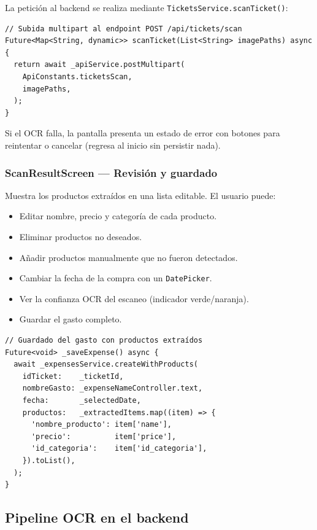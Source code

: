 \documentclass[12pt, letterpaper]{article}
\newcommand{\campo}[1]{\texttt{#1}}
\begin{document}
La petición al backend se realiza mediante \campo{TicketsService.scanTicket()}:

\begin{lstlisting}
// Subida multipart al endpoint POST /api/tickets/scan
Future<Map<String, dynamic>> scanTicket(List<String> imagePaths) async {
  return await _apiService.postMultipart(
    ApiConstants.ticketsScan,
    imagePaths,
  );
}
\end{lstlisting}

Si el OCR falla, la pantalla presenta un estado de error con botones para
reintentar o cancelar (regresa al inicio sin persistir nada).

\subsubsection{ScanResultScreen — Revisión y guardado}

Muestra los productos extraídos en una lista editable. El usuario puede:

\begin{itemize}
  \item Editar nombre, precio y categoría de cada producto.
  \item Eliminar productos no deseados.
  \item Añadir productos manualmente que no fueron detectados.
  \item Cambiar la fecha de la compra con un \campo{DatePicker}.
  \item Ver la confianza OCR del escaneo (indicador verde/naranja).
  \item Guardar el gasto completo.
\end{itemize}

\begin{lstlisting}
// Guardado del gasto con productos extraídos
Future<void> _saveExpense() async {
  await _expensesService.createWithProducts(
    idTicket:    _ticketId,
    nombreGasto: _expenseNameController.text,
    fecha:       _selectedDate,
    productos:   _extractedItems.map((item) => {
      'nombre_producto': item['name'],
      'precio':          item['price'],
      'id_categoria':    item['id_categoria'],
    }).toList(),
  );
}
\end{lstlisting}

\subsection{Pipeline OCR en el backend}
\end{document}
